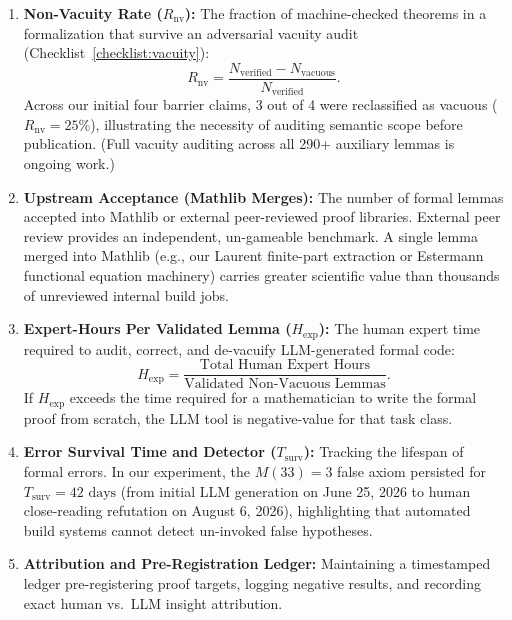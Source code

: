 \documentclass[11pt,a4paper]{article}
\theoremstyle{definition}
\theoremstyle{remark}
\begin{document}
\begin{enumerate}[label=\textbf{\arabic*.}]
  \item \textbf{Non-Vacuity Rate ($R_{\text{nv}}$):} The fraction of machine-checked theorems in a formalization that survive an adversarial vacuity audit (Checklist~\ref{checklist:vacuity}):
  \[
  R_{\text{nv}} = \frac{N_{\text{verified}} - N_{\text{vacuous}}}{N_{\text{verified}}}.
  \]
  Across our initial four barrier claims, 3 out of 4 were reclassified as vacuous ($R_{\text{nv}} = 25\%$), illustrating the necessity of auditing semantic scope before publication. (Full vacuity auditing across all 290+ auxiliary lemmas is ongoing work.)

  \item \textbf{Upstream Acceptance (Mathlib Merges):} The number of formal lemmas accepted into Mathlib or external peer-reviewed proof libraries. External peer review provides an independent, un-gameable benchmark. A single lemma merged into Mathlib (e.g., our Laurent finite-part extraction or Estermann functional equation machinery) carries greater scientific value than thousands of unreviewed internal build jobs.

  \item \textbf{Expert-Hours Per Validated Lemma ($H_{\text{exp}}$):} The human expert time required to audit, correct, and de-vacuify LLM-generated formal code:
  \[
  H_{\text{exp}} = \frac{\text{Total Human Expert Hours}}{\text{Validated Non-Vacuous Lemmas}}.
  \]
  If $H_{\text{exp}}$ exceeds the time required for a mathematician to write the formal proof from scratch, the LLM tool is negative-value for that task class.

  \item \textbf{Error Survival Time and Detector ($T_{\text{surv}}$):} Tracking the lifespan of formal errors. In our experiment, the $M(33)=3$ false axiom persisted for $T_{\text{surv}} = 42\text{ days}$ (from initial LLM generation on June 25, 2026 to human close-reading refutation on August 6, 2026), highlighting that automated build systems cannot detect un-invoked false hypotheses.

  \item \textbf{Attribution and Pre-Registration Ledger:} Maintaining a timestamped ledger pre-registering proof targets, logging negative results, and recording exact human vs.\ LLM insight attribution.
\end{enumerate}

\end{document}
